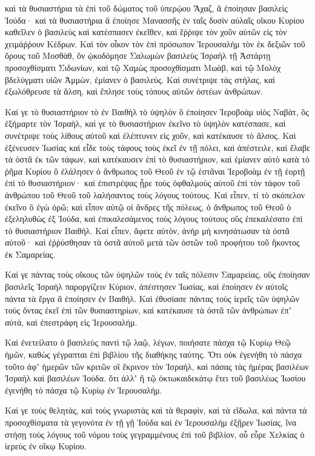 {καὶ τὰ θυσιαστήρια τὰ ἐπὶ τοῦ δώματος τοῦ ὑπερῴου Ἄχαζ, ἃ ἐποίησαν βασιλεὶς Ἰούδα· καὶ τὰ θυσιαστήρια ἃ ἐποίησε Μανασσῆς ἐν ταῖς δυσὶν αὐλαῖς οἴκου Κυρίου καθεῖλεν ὁ βασιλεὺς καὶ κατέσπασεν ἐκεῖθεν, καὶ ἔῤῥιψε τὸν χοῦν αὐτῶν εἰς τὸν χειμάῤῥουν Κέδρων.
Καὶ τὸν οἶκον τὸν ἐπὶ πρόσωπον Ἱερουσαλὴμ τὸν ἐκ δεξιῶν τοῦ ὄρους τοῦ Μοσθὰθ, ὃν ᾠκοδόμησε Σαλωμὼν βασιλεὺς Ἰσραὴλ τῇ Ἀστάρτῃ προσοχθίσματι Σιδωνίων, καὶ τῷ Χαμὼς προσοχθίσματι Μωὰβ, καὶ τῷ Μολὸχ βδελύγματι υἱῶν Ἀμμὼν, ἐμίανεν ὁ βασιλεύς.
Καὶ συνέτριψε τὰς στήλας, καὶ ἐξωλόθρευσε τὰ ἄλση, καὶ ἔπλησε τοὺς τόπους αὐτῶν ὀστέων ἀνθρώπων.
\par }{\PP {}Καί γε τὸ θυσιαστήριον τὸ ἐν Βαιθὴλ τὸ ὑψηλὸν ὃ ἐποίησεν Ἱεροβοὰμ υἱὸς Ναβὰτ, ὃς ἐξήμαρτε τὸν Ἰσραὴλ, καί γε τὸ θυσιαστήριον ἐκεῖνο τὸ ὑψηλὸν κατέσπασε, καὶ συνέτριψε τοὺς λίθους αὐτοῦ καὶ ἐλέπτυνεν εἰς χοῦν, καὶ κατέκαυσε τὸ ἄλσος.
Καὶ ἐξένευσεν Ἰωσίας καὶ εἶδε τοὺς τάφους τοὺς ἐκεῖ ἐν τῇ πόλει, καὶ ἀπέστειλε, καὶ ἔλαβε τὰ ὀστᾶ ἐκ τῶν τάφων, καὶ κατέκαυσεν ἐπὶ τὸ θυσιαστήριον, καὶ ἐμίανεν αὐτὸ κατὰ τὸ ῥῆμα Κυρίου ὃ ἐλάλησεν ὁ ἄνθρωπος τοῦ Θεοῦ ἐν τῷ ἑστᾶναι Ἱεροβοὰμ ἐν τῇ ἑορτῇ ἐπὶ τὸ θυσιαστήριον· καὶ ἐπιστρέψας ᾖρε τοὺς ὀφθαλμοὺς αὐτοῦ ἐπὶ τὸν τάφον τοῦ ἀνθρώπου τοῦ Θεοῦ τοῦ λαλήσαντος τοὺς λόγους τούτους.
Καὶ εἶπεν, τί τὸ σκόπελον ἐκεῖνο ὃ ἐγὼ ὁρῶ; καὶ εἶπον αὐτῷ οἱ ἄνδρες τῆς πόλεως, ὁ ἄνθρωπος τοῦ Θεοῦ ὁ ἐξεληλυθὼς ἐξ Ἰούδα, καὶ ἐπικαλεσάμενος τοὺς λόγους τούτους οὓς ἐπεκαλέσατο ἐπὶ τὸ θυσιαστήριον Βαιθήλ.
Καὶ εἶπεν, ἄφετε αὐτὸν, ἀνὴρ μὴ κινησάτωσαν τὰ ὀστᾶ αὐτοῦ· καὶ ἐῤῥύσθησαν τὰ ὀστᾶ αὐτοῦ μετὰ τῶν ὀστῶν τοῦ προφήτου τοῦ ἥκοντος ἐκ Σαμαρείας.
\par }{\PP {}Καί γε πάντας τοὺς οἴκους τῶν ὑψηλῶν τοὺς ἐν ταῖς πόλεσιν Σαμαρείας, οὓς ἐποίησαν βασιλεῖς Ἰσραὴλ παροργίζειν Κύριον, ἀπέστησεν Ἰωσίας, καὶ ἐποίησεν ἐν αὐτοῖς πάντα τὰ ἔργα ἃ ἐποίησεν ἐν Βαιθήλ.
Καὶ ἐθυσίασε πάντας τοὺς ἱερεῖς τῶν ὑψηλῶν τοὺς ὄντας ἐκεῖ ἐπὶ τῶν θυσιαστηρίων, καὶ κατέκαυσε τὰ ὀστᾶ τῶν ἀνθρώπων ἐπʼ αὐτὰ, καὶ ἐπεστράφη εἰς Ἱερουσαλήμ.
\par }{\PP {}Καὶ ἐνετείλατο ὁ βασιλεὺς παντὶ τῷ λαῷ, λέγων, ποιήσατε πάσχα τῷ Κυρίῳ Θεῷ ἡμῶν, καθὼς γέγραπται ἐπὶ βιβλίου τῆς διαθήκης ταύτης.
Ὅτι οὐκ ἐγενήθη τὸ πάσχα τοῦτο ἀφʼ ἡμερῶν τῶν κριτῶν οἳ ἔκρινον τὸν Ἰσραὴλ, καὶ πάσας τὰς ἡμέρας βασιλέων Ἰσραὴλ καὶ βασιλέων Ἰούδα.
ὅτι ἀλλʼ ἢ τῷ ὀκτωκαιδεκάτῳ ἔτει τοῦ βασιλέως Ἰωσίου ἐγενήθη τὸ πάσχα τῷ Κυρίῳ ἐν Ἰερουσαλήμ.
\par }{\PP {}Καί γε τοὺς θελητὰς, καὶ τοὺς γνωριστὰς καὶ τὰ θεραφὶν, καὶ τὰ εἴδωλα, καὶ πάντα τὰ προσοχθίσματα τὰ γεγονότα ἐν τῇ γῇ Ἰούδα καὶ ἐν Ἱερουσαλὴμ ἐξῇρεν Ἰωσίας, ἵνα στήσῃ τοὺς λόγους τοῦ νόμου τοὺς γεγραμμένους ἐπὶ τοῦ βιβλίον, οὗ εὗρε Χελκίας ὁ ἱερεὺς ἐν οἴκῳ Κυρίου.
}
